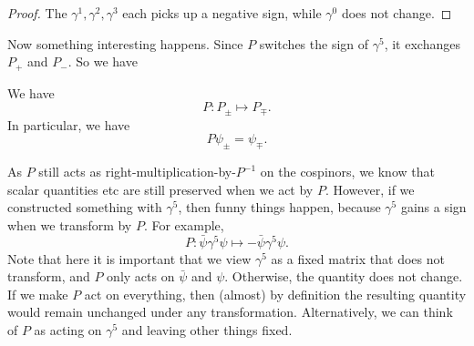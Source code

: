 \documentclass[a4paper]{article}
\begin{document}
\begin{proof}
  The $\gamma^1, \gamma^2, \gamma^3$ each picks up a negative sign, while $\gamma^0$ does not change.
\end{proof}

Now something interesting happens. Since $P$ switches the sign of $\gamma^5$, it exchanges $P_+$ and $P_-$. So we have
\begin{prop}
  We have
  \[
    P: P_{\pm} \mapsto P_{\mp}.
  \]
  In particular, we have
  \[
    P \psi_\pm = \psi_{\mp}.
  \]
\end{prop}

As $P$ still acts as right-multiplication-by-$P^{-1}$ on the cospinors, we know that scalar quantities etc are still preserved when we act by $P$. However, if we constructed something with $\gamma^5$, then funny things happen, because $\gamma^5$ gains a sign when we transform by $P$. For example,
\[
  P: \bar \psi \gamma^5 \psi \mapsto -\bar \psi \gamma^5 \psi.
\]
Note that here it is important that we view $\gamma^5$ as a fixed matrix that does not transform, and $P$ only acts on $\bar\psi$ and $\psi$. Otherwise, the quantity does not change. If we make $P$ act on everything, then (almost) by definition the resulting quantity would remain unchanged under any transformation. Alternatively, we can think of $P$ as acting on $\gamma^5$ and leaving other things fixed. %
\end{document}
